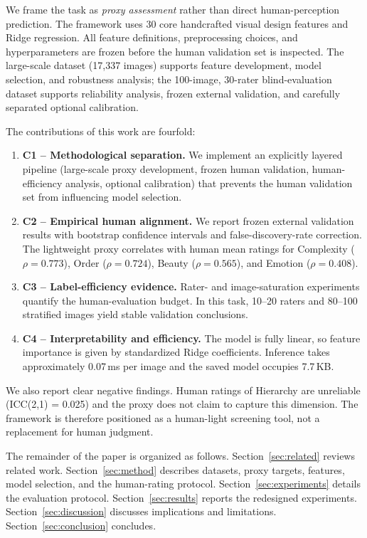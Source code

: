 We frame the task as \textit{proxy assessment} rather than direct human-perception prediction. The framework uses 30 core handcrafted visual design features and Ridge regression. All feature definitions, preprocessing choices, and hyperparameters are frozen before the human validation set is inspected. The large-scale dataset (17,337 images) supports feature development, model selection, and robustness analysis; the 100-image, 30-rater blind-evaluation dataset supports reliability analysis, frozen external validation, and carefully separated optional calibration.

The contributions of this work are fourfold:

\begin{enumerate}
    \item \textbf{C1 -- Methodological separation.} We implement an explicitly layered pipeline (large-scale proxy development, frozen human validation, human-efficiency analysis, optional calibration) that prevents the human validation set from influencing model selection.
    \item \textbf{C2 -- Empirical human alignment.} We report frozen external validation results with bootstrap confidence intervals and false-discovery-rate correction. The lightweight proxy correlates with human mean ratings for Complexity ($\rho = 0.773$), Order ($\rho = 0.724$), Beauty ($\rho = 0.565$), and Emotion ($\rho = 0.408$).
    \item \textbf{C3 -- Label-efficiency evidence.} Rater- and image-saturation experiments quantify the human-evaluation budget. In this task, 10--20 raters and 80--100 stratified images yield stable validation conclusions.
    \item \textbf{C4 -- Interpretability and efficiency.} The model is fully linear, so feature importance is given by standardized Ridge coefficients. Inference takes approximately 0.07\,ms per image and the saved model occupies 7.7\,KB.
\end{enumerate}

We also report clear negative findings. Human ratings of Hierarchy are unreliable (ICC(2,1) = 0.025) and the proxy does not claim to capture this dimension. The framework is therefore positioned as a human-light screening tool, not a replacement for human judgment.

The remainder of the paper is organized as follows. Section~\ref{sec:related} reviews related work. Section~\ref{sec:method} describes datasets, proxy targets, features, model selection, and the human-rating protocol. Section~\ref{sec:experiments} details the evaluation protocol. Section~\ref{sec:results} reports the redesigned experiments. Section~\ref{sec:discussion} discusses implications and limitations. Section~\ref{sec:conclusion} concludes.
